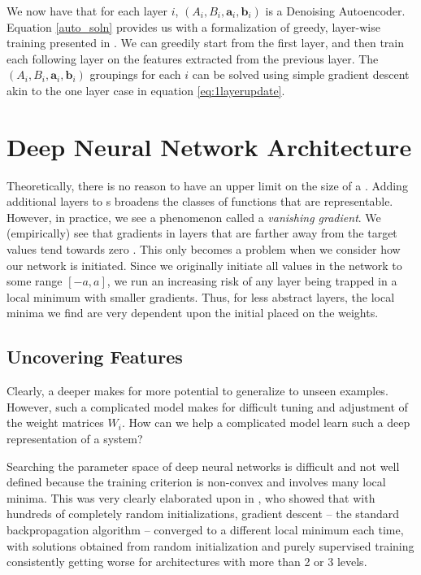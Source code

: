 We now have that for each layer $i$, $(A_i,B_i,\mathbf{a}_i,\mathbf{b}_i)$ is a Denoising Autoencoder. Equation \eqref{auto_soln} provides us with a formalization of greedy, layer-wise training presented in \citep{Vincent:2010fk}. We can greedily start from the first layer, and then train each following layer on the features extracted from the previous layer. The $(A_i,B_i,\mathbf{a}_i,\mathbf{b}_i)$ groupings for each $i$ can be solved using simple gradient descent akin to the one layer case in equation \eqref{eq:1layerupdate}.




\section{Deep Neural Network Architecture}

Theoretically, there is no reason to have an upper limit on the size of a \nn{}. Adding additional layers to \nn{}s broadens the classes of functions that are representable. However, in practice, we see a phenomenon called a \emph{vanishing gradient}. We (empirically) see that gradients in layers that are farther away from the target values tend towards zero \citep{trainingdifficulty}. This only becomes a problem when we consider how our network is initiated. Since we originally initiate all values in the network to some range $[-a,a]$, we run an increasing risk of any layer being trapped in a local minimum with smaller gradients. Thus, for less abstract layers, the local minima we find are very dependent upon the initial placed on the weights. 

\subsection{Uncovering Features}

Clearly, a deeper \nn{} makes for more potential to generalize to unseen examples. However, such a complicated model makes for difficult tuning and adjustment of the weight matrices $W_i$. How can we help a complicated model learn such a deep representation of a system?

Searching the parameter space of deep neural networks is difficult and not well defined because the training criterion is non-convex and involves many local minima. This was very clearly elaborated upon in   \citep{Erhan:2009}, who showed that with hundreds of completely random initializations, gradient descent -- the standard backpropagation algorithm -- converged to a different local minimum each time, with solutions obtained from random initialization and purely supervised training consistently getting worse for architectures with more than 2 or 3 levels.


